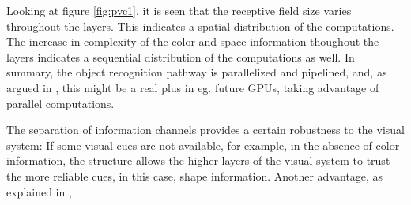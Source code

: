 Looking at figure \ref{fig:pvc1}, it is seen that the receptive field size varies throughout the layers.
This indicates a spatial distribution of the computations.
The increase in complexity of the color and space information thoughout the layers
indicates a sequential distribution of the computations as well. In summary, the object recognition pathway
is parallelized and pipelined, and, as argued in \cite{kruger2013deep},
this might be a real plus in eg. future GPUs, taking advantage of parallel computations.

The separation of information channels provides a certain robustness to the visual system:
If some visual cues are not available, for example, in the absence of color information,
the structure allows the higher layers of the visual system to trust the more reliable cues,
in this case, shape information.
Another advantage, as explained in \cite{kruger2013deep},
